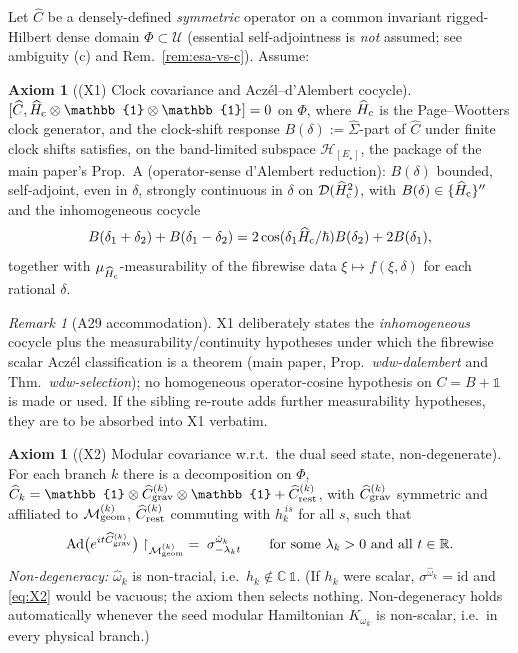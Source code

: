 \documentclass[11pt,a4paper]{article}
\theoremstyle{definition}
\newtheorem{axiom}[theorem]{Axiom}
\theoremstyle{remark}
\newtheorem{remark}[theorem]{Remark}
\newcommand{\HH}{\mathcal{H}}
\newcommand{\MM}{\mathcal{M}}
\newcommand{\RR}{\mathbb{R}}
\newcommand{\CC}{\mathbb{C}}
\newcommand{\id}{\mathbb{1}}
\begin{document}
Let $\widehat C$ be a densely-defined \emph{symmetric} operator
on a common invariant rigged-Hilbert dense domain
$\Phi\subset\mathcal U$ (essential self-adjointness is
\emph{not} assumed; see ambiguity (c) and
Rem.~\ref{rem:esa-vs-c}). Assume:

\begin{axiom}[(X1) Clock covariance and Acz\'el--d'Alembert
cocycle]\label{ax:X1}
$[\widehat C,\widehat H_{\rm c}\otimes\id\otimes\id]=0$ on
$\Phi$, where $\widehat H_{\rm c}$ is the Page--Wootters clock
generator, and the clock-shift response
$B(\delta):=\widehat\Sigma$-part of $\widehat C$ under finite
clock shifts satisfies, on the band-limited subspace
$\HH_{[E_\star]}$, the package of the main paper's
Prop.~A (operator-sense d'Alembert reduction): $B(\delta)$
bounded, self-adjoint, even in $\delta$, strongly continuous
in $\delta$ on $\mathcal D(\widehat H_{\rm c}^2)$, with
$B(\delta)\in\{\widehat H_{\rm c}\}''$ and the inhomogeneous
cocycle
\[
  B(\delta_1+\delta_2)+B(\delta_1-\delta_2)
  =2\cos(\delta_1\widehat H_{\rm c}/\hbar)B(\delta_2)
  +2B(\delta_1),
\]
together with $\mu_{\widehat H_{\rm c}}$-measurability of the
fibrewise data $\xi\mapsto f(\xi,\delta)$ for each rational
$\delta$.
\end{axiom}

\begin{remark}[A29 accommodation]\label{rem:A29}
X1 deliberately states the \emph{inhomogeneous} cocycle plus
the measurability/continuity hypotheses under which the
fibrewise scalar Acz\'el classification is a theorem (main
paper, Prop.~\emph{wdw-dalembert} and
Thm.~\emph{wdw-selection}); no homogeneous operator-cosine
hypothesis on $C=B+\id$ is made or used. If the sibling
re-route adds further measurability hypotheses, they are to be
absorbed into X1 verbatim.
\end{remark}

\begin{axiom}[(X2) Modular covariance w.r.t.\ the dual seed
state, non-degenerate]\label{ax:X2}
For each branch $k$ there is a decomposition on $\Phi$,
$\widehat C_k=\id\otimes\widehat C_{\rm grav}^{(k)}\otimes\id
+\widehat C_{\rm rest}^{(k)}$, with
$\widehat C_{\rm grav}^{(k)}$ symmetric and affiliated to
$\MM_{\rm geom}^{(k)}$, $\widehat C_{\rm rest}^{(k)}$
commuting with $h_k^{\,is}$ for all $s$, such that
\begin{equation}\label{eq:X2}
  \mathrm{Ad}\bigl(e^{it\widehat C_{\rm grav}^{(k)}}\bigr)
  \restriction_{\MM_{\rm geom}^{(k)}}
  \;=\;\sigma^{\hat\omega_k}_{-\lambda_k t}
  \qquad\text{for some }\lambda_k>0\text{ and all }t\in\RR .
\end{equation}
\emph{Non-degeneracy:} $\hat\omega_k$ is non-tracial, i.e.\
$h_k\notin\CC\,\id$. (If $h_k$ were scalar,
$\sigma^{\hat\omega_k}=\mathrm{id}$ and \eqref{eq:X2} would be
vacuous; the axiom then selects nothing. Non-degeneracy holds
automatically whenever the seed modular Hamiltonian
$K_{\omega_k}$ is non-scalar, i.e.\ in every physical branch.)
\end{axiom}
\end{document}
